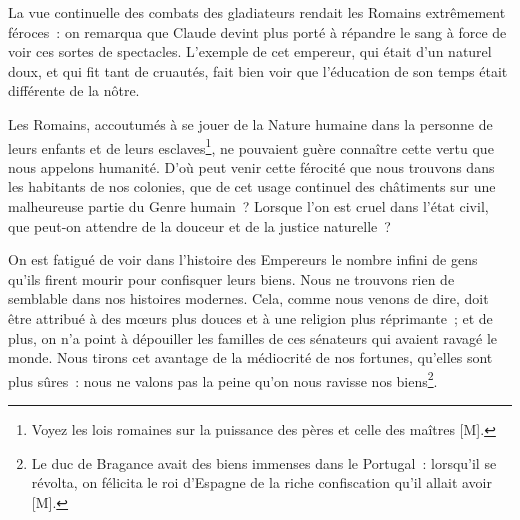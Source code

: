\documentclass[french,twoside]{book} %
\begin{document}
La vue continuelle des combats des gladiateurs rendait les Romains extrêmement féroces : on remarqua que Claude devint plus porté à répandre le sang à force de voir ces sortes de spectacles. L’exemple de cet empereur, qui était d’un naturel doux, et qui fit tant de cruautés, fait bien voir que l’éducation de son temps était différente de la nôtre.\par
Les Romains, accoutumés à se jouer de la Nature humaine dans la personne de leurs enfants et de leurs esclaves\footnote{Voyez les lois romaines sur la puissance des pères et celle des maîtres [M].}, ne pouvaient guère connaître cette vertu que nous appelons humanité. D’où peut venir cette férocité que nous trouvons dans les habitants de nos colonies, que de cet usage continuel des châtiments sur une malheureuse partie du Genre humain ? Lorsque l’on est cruel dans l’état civil, que peut-on attendre de la douceur et de la justice naturelle ?\par
On est fatigué de voir dans l’histoire des Empereurs le nombre infini de gens qu’ils firent mourir pour confisquer leurs biens. Nous ne trouvons rien de semblable dans nos histoires modernes. Cela, comme nous venons de dire, doit être attribué à des mœurs plus douces et à une religion plus réprimante ; et de plus, on n’a point à dépouiller les familles de ces sénateurs qui avaient ravagé le monde. Nous tirons cet avantage de la médiocrité de nos fortunes, qu’elles sont plus sûres : nous ne valons pas la peine qu’on nous ravisse nos biens\footnote{Le duc de Bragance avait des biens immenses dans le Portugal : lorsqu’il se révolta, on félicita le roi d’Espagne de la riche confiscation qu’il allait avoir [M].}.\par
\end{document}
